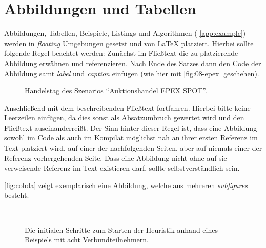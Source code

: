 \section{Abbildungen und Tabellen}\label{sec:abbildungen}
%
%
Abbildungen, Tabellen, Beispiele, Listings und Algorithmen (\vgl{} \autoref{app:example}) werden in \emph{floating} Umgebungen gesetzt und von \LaTeX{} platziert. Hierbei sollte folgende Regel beachtet werden: Zunächst im Fließtext die zu platzierende Abbildung \oae{} erwähnen und referenzieren. Nach Ende des Satzes dann den Code der Abbildung samt \emph{label} und \emph{caption} einfügen (wie hier mit \autoref{fig:08-epex} geschehen).
%
\begin{figure}
  \centering
  
  \caption[\textsf{EPEX SPOT} (Handelstag)]{Handelstag des Szenarios \enquote{Auktionshandel \textsf{EPEX SPOT}}.}
  \label{fig:08-epex}
\end{figure}
%
Anschließend mit dem beschreibenden Fließtext fortfahren. Hierbei bitte keine Leerzeilen einfügen, da dies sonst als Absatzumbruch gewertet wird und den Fließtext auseinanderreißt. Der Sinn hinter dieser Regel ist, dass eine Abbildung sowohl im Code als auch im Kompilat möglichst nah an ihrer ersten Referenz im Text platziert wird, \ggf{} auf einer der nachfolgenden Seiten, aber auf niemals einer der Referenz vorhergehenden Seite. Dass eine Abbildung nicht ohne auf sie verweisende Referenz im Text existieren darf, sollte selbstverständlich sein.
%
\par \autoref{fig:cohda} zeigt exemplarisch eine Abbildung, welche aus mehreren \emph{subfigures} besteht.
%
\begin{figure}
  \centering
  \hfill
  \\
  \hfill
  \caption[Heuristik: \COHDA{}]{Die initialen Schritte zum Starten der \COHDA{} Heuristik\protect\footnotemark{} anhand eines Beispiels mit acht Verbundteilnehmern.}
  \label{fig:cohda}
\end{figure}
